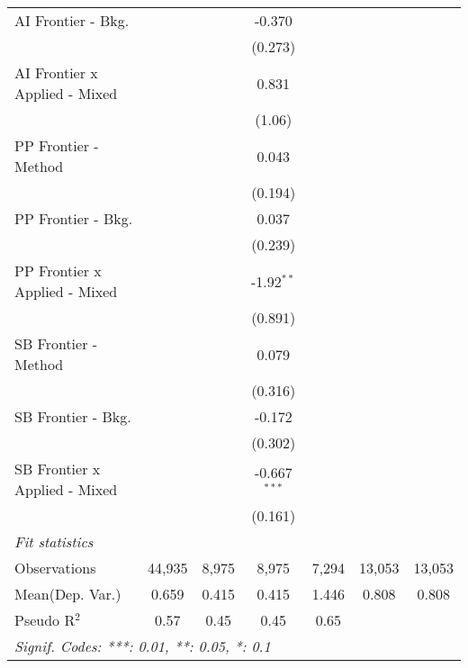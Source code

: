 \begin{tabular}{lcccccc}
   AI Frontier - Bkg.            &               &         & -0.370         &               &        &   \\   
                                 &               &         & (0.273)        &               &        &   \\   
   AI Frontier x Applied - Mixed &               &         & 0.831          &               &        &   \\   
                                 &               &         & (1.06)         &               &        &   \\   
   PP Frontier - Method          &               &         & 0.043          &               &        &   \\   
                                 &               &         & (0.194)        &               &        &   \\   
   PP Frontier - Bkg.            &               &         & 0.037          &               &        &   \\   
                                 &               &         & (0.239)        &               &        &   \\   
   PP Frontier x Applied - Mixed &               &         & -1.92$^{**}$   &               &        &   \\   
                                 &               &         & (0.891)        &               &        &   \\   
   SB Frontier - Method          &               &         & 0.079          &               &        &   \\   
                                 &               &         & (0.316)        &               &        &   \\   
   SB Frontier - Bkg.            &               &         & -0.172         &               &        &   \\   
                                 &               &         & (0.302)        &               &        &   \\   
   SB Frontier x Applied - Mixed &               &         & -0.667$^{***}$ &               &        &   \\   
                                 &               &         & (0.161)        &               &        &   \\   
   \midrule
   \emph{Fit statistics}\\
   Observations                  & 44,935        & 8,975   & 8,975          & 7,294         & 13,053 & 13,053\\  
Mean(Dep. Var.) & 0.659 & 0.415 & 0.415 & 1.446 & 0.808 & 0.808 \\
   Pseudo R$^2$                  & 0.57          & 0.45    & 0.45           & 0.65          &        & \\  
   \midrule \midrule
   \multicolumn{7}{l}{\emph{Signif. Codes: ***: 0.01, **: 0.05, *: 0.1}}\\
\end{tabular}
\par\endgroup
